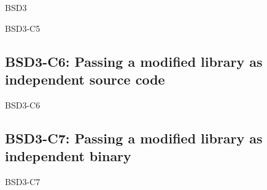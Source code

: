 \begin{license}{BSD3}
\begin{lsuc}{BSD3-C5}
  \lsucmeans{\useCaseFive}
  \lsuccovers{\coversFive}

  \begin{lsucrequires}
    \lsucmandatory{\insertLicenseIntoBinary}\passingFilesCorrectly
    \lsucoptional{\addLicenseToCopyrightMessage}
  \end{lsucrequires}

  \begin{lsucprohibits}
    \lsucitem{\dontUseAuthorNames}%
  \end{lsucprohibits}
\end{lsuc}

\subsection{BSD3-C6: Passing a modified library as independent source code}
\begin{lsuc}{BSD3-C6}

  \lsucmeans{\useCaseSix}
  \lsuccovers{\coversSix}

  \begin{lsucrequires}
    \lsucmandatory{\keepLicenseElements}
  \end{lsucrequires}

  \begin{lsucprohibits}
    \lsucitem{\dontUseAuthorNames}%
  \end{lsucprohibits}
\end{lsuc}

\subsection{BSD3-C7: Passing a modified library as independent binary}
\begin{lsuc}{BSD3-C7}

  \lsucmeans{\useCaseSeven}
  \lsuccovers{\coversSeven}

  \begin{lsucrequires}
    \lsucmandatory{\insertLicenseIntoBinary}\passingFilesCorrectly
  \end{lsucrequires}

  \begin{lsucprohibits}
    \lsucitem{\dontUseAuthorNames}%
  \end{lsucprohibits}
\end{lsuc}


\end{license}
